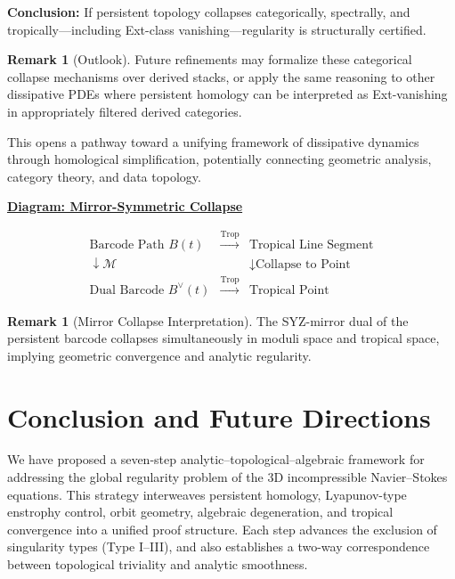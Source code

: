 \documentclass[11pt]{article}
\theoremstyle{definition}
\newtheorem{remark}[theorem]{Remark}
\begin{document}
\textbf{Conclusion:} If persistent topology collapses categorically, spectrally, and tropically---including Ext-class vanishing---regularity is structurally certified.

\begin{remark}[Outlook]
Future refinements may formalize these categorical collapse mechanisms over derived stacks, or apply the same reasoning to other dissipative PDEs where persistent homology can be interpreted as Ext-vanishing in appropriately filtered derived categories.
\end{remark}

This opens a pathway toward a unifying framework of dissipative dynamics through homological simplification, potentially connecting geometric analysis, category theory, and data topology.

\begin{center}
\textbf{\underline{Diagram: Mirror-Symmetric Collapse}}
\end{center}
\[
\begin{array}{ccc}
\text{Barcode Path } B(t) & \xrightarrow{\text{Trop}} & \text{Tropical Line Segment} \\
\downarrow \mathcal{M} &  & \downarrow \text{Collapse to Point} \\
\text{Dual Barcode } B^\vee(t) & \xrightarrow{\text{Trop}} & \text{Tropical Point}
\end{array}
\]

\begin{remark}[Mirror Collapse Interpretation]
The SYZ-mirror dual of the persistent barcode collapses simultaneously in moduli space and tropical space, implying geometric convergence and analytic regularity.
\end{remark}




\section{Conclusion and Future Directions}

We have proposed a seven-step analytic–topological–algebraic framework for addressing the global regularity problem of the 3D incompressible Navier–Stokes equations. This strategy interweaves persistent homology, Lyapunov-type enstrophy control, orbit geometry, algebraic degeneration, and tropical convergence into a unified proof structure. Each step advances the exclusion of singularity types (Type I–III), and also establishes a two-way correspondence between topological triviality and analytic smoothness.
\end{document}
